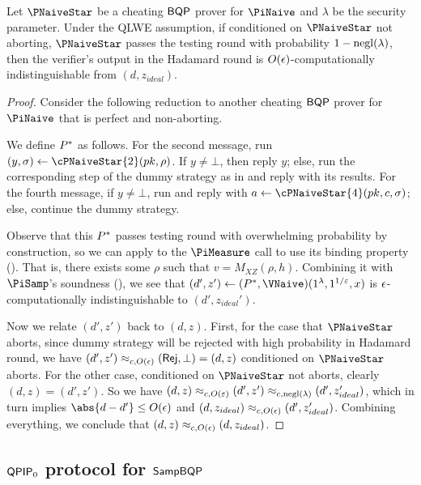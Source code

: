 \begin{lemma}
\label{lem:naive-qpip0-binding}
    Let $\PNaiveStar$ be a cheating $\operatorname{\mathsf{BQP}}$ prover for $\PiNaive$ and $\lambda$ be the security parameter.
    Under the QLWE assumption, if conditioned on $\PNaiveStar$ not aborting, $\PNaiveStar$ passes the testing round with probability $1-\operatorname{negl}(\lambda)$,
    then the verifier's output in the Hadamard round is $O(\epsilon)$-computationally indistinguishable from $(d, z_{ideal})$.
\end{lemma}
\begin{proof}
    Consider the following reduction to another cheating $\operatorname{\mathsf{BQP}}$ prover for $\PiNaive$ that is perfect and non-aborting.

    We define $P^*$ as follows.
    For the second message, run $(y, \sigma)\leftarrow\cPNaiveStar{2}(pk, \rho)$.
    If $y\ne\bot$, then reply $y$;
    else, run the corresponding step of the dummy strategy as in  and reply with its results.
    For the fourth message, if $y\ne\bot$, run and reply with $a\leftarrow\cPNaiveStar{4}(pk, c, \sigma)$;
    else, continue the dummy strategy.

    Observe that this $P^*$ passes testing round with overwhelming probability by construction,
    so we can apply  to the $\PiMeasure$ call to use its binding property ().
    That is, there exists some $\rho$ such that $v=M_{XZ}(\rho, h)$.
    Combining it with $\PiSamp$'s soundness (),
    we see that $(d', z')\leftarrow(\Pstar, \VNaive)(1^\lambda, 1^{1/\varepsilon}, x)$ is $\epsilon$-computationally indistinguishable to $(d', z_{ideal}')$.
    
    Now we relate $(d', z')$ back to $(d, z)$.
    First, for the case that $\PNaiveStar$ aborts, since dummy strategy will be rejected with high probability in Hadamard round,
    we have $(d', z')\approx_{c, O(\epsilon)}(\mathsf{Rej}, \bot)=(d, z)$ conditioned on $\PNaiveStar$ aborts.
    For the other case, conditioned on $\PNaiveStar$ not aborts, clearly $(d, z)=(d', z')$.
    So we have $(d, z)\approx_{c, O(\varepsilon)}(d', z')\approx_{c, \operatorname{negl}(\lambda)}(d', z_{ideal}')$,
    which in turn implies $\abs{d-d'}\leq O(\eps)$
    and $(d, z_{ideal})\approx_{c, O(\epsilon)}(d', z_{ideal}')$.
    Combining everything, we conclude that $(d, z)\approx_{c, O(\epsilon)}(d, z_{ideal})$.
\end{proof}

\subsection{$\operatorname{\mathsf{QPIP}}_0$ protocol for $\operatorname{\mathsf{SampBQP}}$} \label{sec:qpip0}

